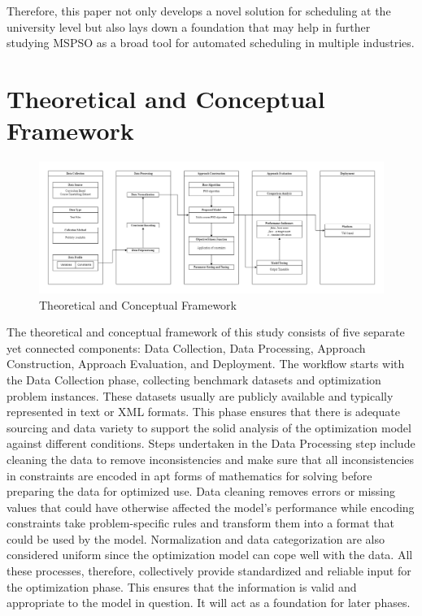 \documentclass{article}
\begin{document}
Therefore, this paper not only develops a novel solution for scheduling at the university level but also lays down a foundation that may help in further studying MSPSO as a broad tool for automated scheduling in multiple industries.

\section{Theoretical and Conceptual Framework}
\label{sec:theoreticalframework}

\begin{figure}[h] %
    \centering
    \includegraphics[width=1\textwidth]{framework}
    \caption{Theoretical and Conceptual Framework}
    \label{fig:framework} %
\end{figure}

The theoretical and conceptual framework of this study consists of five separate yet connected components: Data Collection, Data Processing, Approach Construction, Approach Evaluation, and Deployment. The workflow starts with the Data Collection phase, collecting benchmark datasets and optimization problem instances. These datasets usually are publicly available and typically represented in text or XML formats. This phase ensures that there is adequate sourcing and data variety to support the solid analysis of the optimization model against different conditions. Steps undertaken in the Data Processing step include cleaning the data to remove inconsistencies and make sure that all inconsistencies in constraints are encoded in apt forms of mathematics for solving before preparing the data for optimized use. Data cleaning removes errors or missing values that could have otherwise affected the model's performance while encoding constraints take problem-specific rules and transform them into a format that could be used by the model. Normalization and data categorization are also considered uniform since the optimization model can cope well with the data. All these processes, therefore, collectively provide standardized and reliable input for the optimization phase. This ensures that the information is valid and appropriate to the model in question. It will act as a foundation for later phases.
\end{document}

